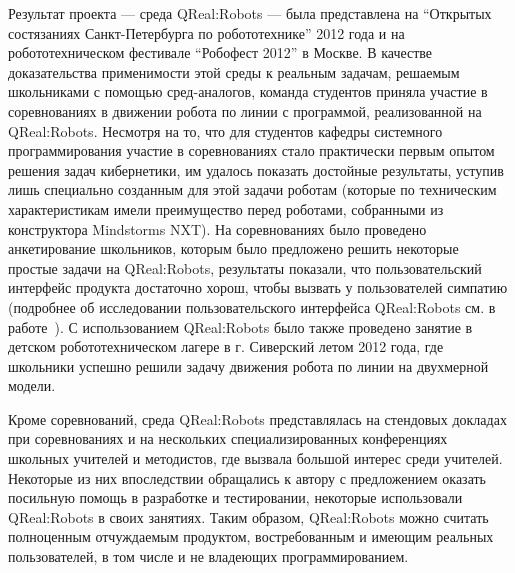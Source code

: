 Результат проекта --- среда QReal:Robots --- была представлена на "`Открытых состязаниях 
Санкт-Петербурга по робототехнике"' 2012 года и на робототехническом фестивале "`Робофест 2012"' 
в Москве. В качестве доказательства применимости этой среды к реальным задачам, решаемым 
школьниками с помощью сред-аналогов, команда студентов приняла участие в соревнованиях 
в движении робота по линии с программой, реализованной на QReal:Robots. Несмотря на 
то, что для студентов кафедры системного программирования участие в соревнованиях 
стало практически первым опытом решения задач кибернетики, им удалось показать достойные 
результаты, уступив лишь специально созданным для этой задачи роботам (которые 
по техническим характеристикам имели преимущество перед роботами, собранными из конструктора 
Mindstorms NXT). На соревнованиях было проведено анкетирование школьников, которым 
было предложено решить некоторые простые задачи на QReal:Robots, результаты показали, 
что пользовательский интерфейс продукта достаточно хорош, чтобы вызвать у пользователей 
симпатию (подробнее об исследовании пользовательского интерфейса QReal:Robots см. в работе~\cite{sokovikova2012usability}). 
С использованием QReal:Robots было также проведено занятие в детском робототехническом 
лагере в г. Сиверский летом 2012 года, где школьники успешно решили задачу движения 
робота по линии на двухмерной модели.

Кроме соревнований, среда QReal:Robots представлялась на стендовых докладах при соревнованиях
и на нескольких специализированных конференциях школьных учителей и методистов, где 
вызвала большой интерес среди учителей. Некоторые из них впоследствии обращались 
к автору с предложением оказать посильную помощь в разработке и тестировании, некоторые 
использовали QReal:Robots в своих занятиях. Таким образом, QReal:Robots можно считать 
полноценным отчуждаемым продуктом, востребованным и имеющим реальных пользователей, 
в том числе и не владеющих программированием.
